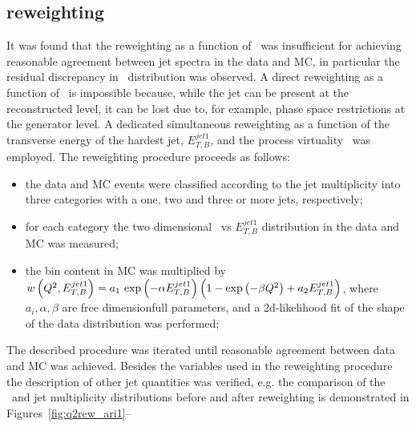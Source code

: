 \subsection{\ariadne reweighting}
It was found that the reweighting as a function of \qsq~was insufficient for achieving reasonable agreement between jet spectra in the data and \ariadne MC, in particular the residual discrepancy in \etjetb~distribution was observed. A direct reweighting as a function of \etjetb~is impossible because, while the jet can be present at the reconstructed level, it can be lost due to, for example, phase space restrictions at the generator level. A dedicated simultaneous reweighting as a function of the transverse energy of the hardest jet, $E_{T,B}^{jet1}$, and the process virtuality \qsq~was employed. The reweighting procedure proceeds as follows:
\begin{itemize}
	\item the data and MC events were classified according to the jet multiplicity into three categories with a one, two and three or more jets, respectively;
	\item for each category the two dimensional \qsq~vs $E_{T,B}^{jet1}$ distribution in the data and MC was measured;
	\item the bin content in MC was multiplied by \\$w\left( \mbox{${Q^2}$}, E_{T,B}^{jet1} \right)=a_1\,\exp{\left( -\alpha E_{T,B}^{jet1}\right) }\left(1- \exp{\left( -\beta\mbox{${Q^2}$}\right) } + a_2 E_{T,B}^{jet1} \right) $, where $a_i, \alpha, \beta$ are free dimensionfull parameters, and a 2d-likelihood fit of the shape of the data distribution was performed;
\end{itemize}
The described procedure was iterated until reasonable agreement between data and MC was achieved. Besides the variables used in the reweighting procedure the description of other jet quantities was verified, e.g. the comparison of the \etajetb~and jet multiplicity distributions before and after reweighting is demonstrated in Figures~\ref{fig:q2rew_ari1}--

